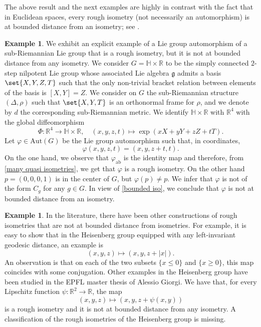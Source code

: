 \documentclass[a4paper,11pt,reqno]{amsart}
\theoremstyle{plain}
\theoremstyle{definition}
\newtheorem{example}[theorem]{Example}
\newcommand{\R}{\mathbb R}
\newcommand{\N}{\mathbb N}
\renewcommand{\H}{\mathbb H}
\newcommand{\g}{\mathfrak{g}}
\newcommand{\vphi}{\varphi}
\begin{document}
The above result and the next examples are highly in contrast with the fact that in Euclidean spaces, every rough isometry (not necessarily an automorphism) is at bounded distance from an isometry; see \cite[Theorem~3]{MR511409}.


\begin{example} \label{final example}
 We exhibit an explicit example of a Lie group automorphism of a sub-Riemannian Lie group that is a rough isometry, but it is not at bounded distance from any isometry. We consider $G = \H \times \R$ to be the simply connected $2$-step nilpotent Lie group whose associated Lie algebra $\g$ admits a basis $\set{X,Y,Z,T}$ such that the only non-trivial bracket relation between elements of the basis is $[X,Y]=Z$.
 We consider on $G$ the sub-Riemannian structure $(\Delta,\rho)$ such that $\set{X,Y,T}$ is an orthonormal frame for $\rho$, and we denote by $d$ the corresponding sub-Riemannian metric. We identify $\H \times \R$ with $\R^4$ with the global diffeomorphism
 \begin{equation*}
 \Phi \colon \R^4 \to \H \times \R, \quad (x,y,z,t) \mapsto \exp(xX + yY + zZ + tT).
 \end{equation*}
Let $\vphi \in \mathrm{Aut}(G)$ be the Lie group automorphism such that, in coordinates,
 \begin{equation*} 
 \vphi(x,y,z,t)=(x,y,z+t,t).
 \end{equation*}
 On the one hand, we observe that $\vphi_\mathrm{ab}$ is the identity map and therefore, from \cref{many quasi isometries}, we get that $\vphi$ is a rough isometry. On the other hand $p = (0,0,0,1)$ is in the center of $G$, but $\vphi(p) \neq p$. We infer that $\vphi$ is not of the form $C_g$ for any $g \in G$. In view of \cref{bounded iso}, we conclude that $\vphi$ is not at bounded distance from an isometry.
\end{example}
\begin{example} \label{Giorgi example}
In the literature, there have been other constructions of rough isometries that are not at bounded distance from isometries. For example, it is easy to show that in the Heisenberg group equipped with any left-invariant geodesic distance, an example is
$$(x,y,z)\mapsto (x,y,z+|x|).$$
An observation is that on each of the two subsets $\{x\leq 0\}$ and $\{x\geq 0\}$, this map coincides with some conjugation.
Other examples in the Heisenberg group have been studied in the EPFL master thesis of Alessio Giorgi. We have that, for every Lipschitz function $\psi:\R^2\to \R$, the map $$(x,y,z)\mapsto (x,y,z+\psi(x,y))$$ is a
rough isometry and it is not at bounded distance from any isometry.
A classification of the rough isometries of the Heisenberg group is missing.
\end{example}
\end{document}
